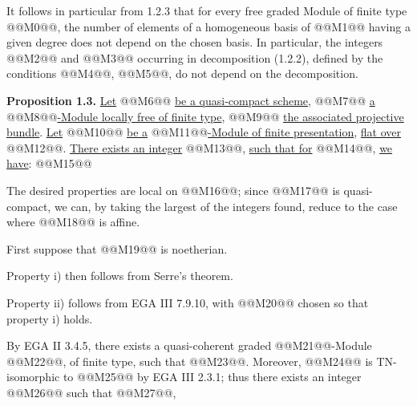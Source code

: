It follows in particular from 1.2.3 that for every free graded Module of finite type @@M0@@, the number of elements of a homogeneous basis of @@M1@@ having a given degree does not depend on the chosen basis. In particular, the integers @@M2@@ and @@M3@@ occurring in decomposition (1.2.2), defined by the conditions @@M4@@, @@M5@@, do not depend on the decomposition.

\textbf{Proposition 1.3.} \uline{Let} @@M6@@ \uline{be a quasi-compact scheme}, @@M7@@ \uline{a} @@M8@@\uline{-Module locally free of finite type}, @@M9@@ \uline{the associated projective bundle}. \uline{Let} @@M10@@ \uline{be a} @@M11@@\uline{-Module of finite presentation}, \uline{flat over} @@M12@@. \uline{There exists an integer} @@M13@@, \uline{such that for} @@M14@@, \uline{we have}:
@@M15@@

The desired properties are local on @@M16@@; since @@M17@@ is quasi-compact, we can, by taking the largest of the integers found, reduce to the case where @@M18@@ is affine.

First suppose that @@M19@@ is noetherian.

Property i) then follows from Serre's theorem.

Property ii) follows from EGA III 7.9.10, with @@M20@@ chosen so that property i) holds.

By EGA II 3.4.5, there exists a quasi-coherent graded @@M21@@-Module @@M22@@, of finite type, such that @@M23@@. Moreover, @@M24@@ is TN-isomorphic to @@M25@@ by EGA III 2.3.1; thus there exists an integer @@M26@@ such that @@M27@@,
